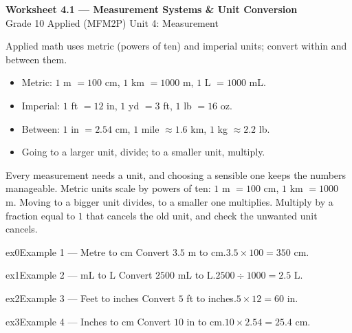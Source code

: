 \documentclass[11pt]{article}
\begin{document}
\begin{center}
{\LARGE\bfseries\color{titleblue}Worksheet 4.1 --- Measurement Systems \& Unit Conversion}\\[2pt]
{\small Grade 10 Applied (MFM2P) \textperiodcentered{} Unit 4: Measurement}
\end{center}

\begin{ideabox}
Applied math uses metric (powers of ten) and imperial units; convert within and between them.
\begin{itemize}[leftmargin=*,itemsep=2pt]
  \item Metric: $1$ m $=100$ cm, $1$ km $=1000$ m, $1$ L $=1000$ mL.
  \item Imperial: $1$ ft $=12$ in, $1$ yd $=3$ ft, $1$ lb $=16$ oz.
  \item Between: $1$ in $=2.54$ cm, $1$ mile $\approx1.6$ km, $1$ kg $\approx2.2$ lb.
  \item Going to a larger unit, divide; to a smaller unit, multiply.
\end{itemize}
\end{ideabox}

\begin{learnbox}
Every measurement needs a unit, and choosing a sensible one keeps the numbers manageable.
Metric units scale by powers of ten: $1$ m $=100$ cm, $1$ km $=1000$ m. Moving to a bigger unit divides, to a smaller one multiplies.
Multiply by a fraction equal to $1$ that cancels the old unit, and check the unwanted unit cancels.
\end{learnbox}


\begin{example}{ex0}{Example 1 --- Metre to cm}
Convert $3.5$ m to cm.\soln $3.5\times100=350$ cm.
\end{example}

\begin{example}{ex1}{Example 2 --- mL to L}
Convert $2500$ mL to L.\soln $2500\div1000=2.5$ L.
\end{example}

\begin{example}{ex2}{Example 3 --- Feet to inches}
Convert $5$ ft to inches.\soln $5\times12=60$ in.
\end{example}

\begin{example}{ex3}{Example 4 --- Inches to cm}
Convert $10$ in to cm.\soln $10\times2.54=25.4$ cm.
\end{example}
\end{document}
